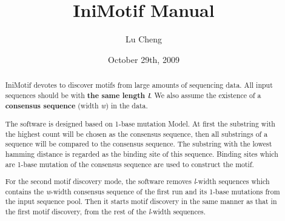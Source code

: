 \documentclass[a4paper,10pt]{article}
\title{IniMotif Manual}
\author{Lu Cheng}
\date{October 29th, 2009}
\begin{document}
\maketitle

\begin{abstract}
IniMotif devotes to discover motifs from large amounts of sequencing data.
All input sequences should be with \textbf{the same length \textit{l}}.
We also assume the existence of a \textbf{consensus sequence} (width \textit{w}) in the data.

The software is designed based on 1-base mutation Model.
At first the substring with the highest count will be chosen as the consensus sequence, then all substrings of a sequence will be compared to the consensus sequence.
The substring with the lowest hamming distance is regarded as the binding site of this sequence.
Binding sites which are 1-base mutation of the consensus sequence are used to construct the motif.

For the second motif discovery mode, the software removes \textit{l}-width sequences which contains the \textit{w}-width consensus sequence of the first run and its 1-base mutations from the input sequence pool.
Then it starts motif discovery in the same manner as that in the first motif discovery, from the rest of the \textit{l}-width sequences.
\end{abstract}
\end{document}
